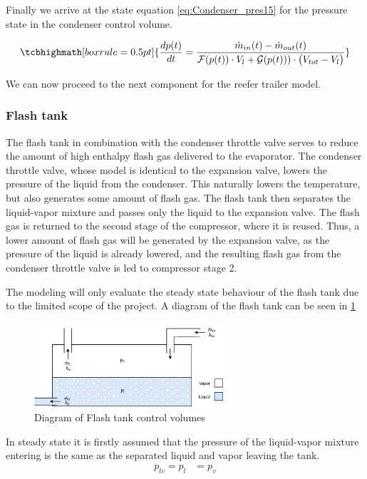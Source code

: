 Finally we arrive at the state equation \cref{eq:Condenser_pres15} for the pressure state in the condenser control volume.

\begin{equation} 
	\tcbhighmath[boxrule = 0.5pt]{\frac{dp(t)}{dt} = \dfrac{\dot{m}_{in}(t) - \dot{m}_{out}(t)}{ \mathcal{F}(p(t)) \cdot V_l +  \mathcal{G}(p(t))) \cdot \bigl(V_{tot} - V_l\bigr) }}\label{eq:Condenser_pres15}
\end{equation}

We can now proceed to the next component for the reefer trailer model.

\subsubsection{Flash tank}
The flash tank in combination with the condenser throttle valve serves to reduce the amount of high enthalpy flash gas delivered to the evaporator. The condenser throttle valve, whose model is identical to the expansion valve, lowers the pressure of the liquid from the condenser. This naturally lowers the temperature, but also generates some amount of flash gas. The flash tank then separates the liquid-vapor mixture and passes only the liquid to the expansion valve. The flash gas is returned to the second stage of the compressor, where it is reused. Thus, a lower amount of flash gas will be generated by the expansion valve, as the pressure of the liquid is already lowered, and the resulting flash gas from the condenser throttle valve is led to compressor stage 2.

The modeling will only evaluate the steady state behaviour of the flash tank due to the limited scope of the project. A diagram of the flash tank can be seen in \cref{fig:flash_tank_CV}

\begin{figure}[h!]
	\centering
	\includegraphics[width=0.65\textwidth]{Graphics/Flash_tank.pdf}
	\caption{Diagram of Flash tank control volumes}
	\label{fig:flash_tank_CV}
\end{figure}

In steady state it is firstly assumed that the pressure of the liquid-vapor mixture entering is the same as the separated liquid and vapor leaving the tank.
\begin{align}
	p_{lv} 	= p_{l}					&  = p_{v}
	\label{eq:Flash_tank_pressure}
\end{align}

